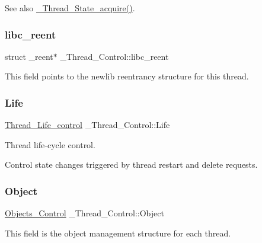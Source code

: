\begin{DoxySeeAlso}{See also}
\mbox{\hyperlink{group__RTEMSScoreThread_ga9a583864cdcbb7eaeda8002d05de6912}{\+\_\+\+Thread\+\_\+\+State\+\_\+acquire()}}. 
\end{DoxySeeAlso}
\mbox{\label{struct__Thread__Control_af33017bd9e4bb1a83e49162cb9bc56cd}} 
\subsubsection{\texorpdfstring{libc\_reent}{libc\_reent}}
{\footnotesize\ttfamily struct \+\_\+reent$\ast$ \+\_\+\+Thread\+\_\+\+Control\+::libc\+\_\+reent}

This field points to the newlib reentrancy structure for this thread. \mbox{\label{struct__Thread__Control_a9d1a643fb09a4ed7ab24728b6c8c4962}} 
\subsubsection{\texorpdfstring{Life}{Life}}
{\footnotesize\ttfamily \mbox{\hyperlink{structThread__Life__control}{Thread\+\_\+\+Life\+\_\+control}} \+\_\+\+Thread\+\_\+\+Control\+::\+Life}



Thread life-\/cycle control. 

Control state changes triggered by thread restart and delete requests. \mbox{\label{struct__Thread__Control_a139d65c71b92360520466017b402075b}} 
\subsubsection{\texorpdfstring{Object}{Object}}
{\footnotesize\ttfamily \mbox{\hyperlink{structObjects__Control}{Objects\+\_\+\+Control}} \+\_\+\+Thread\+\_\+\+Control\+::\+Object}

This field is the object management structure for each thread. \mbox{\label{struct__Thread__Control_a0a29cd9033f1b047dfa0877e6ddb4bbe}} 
